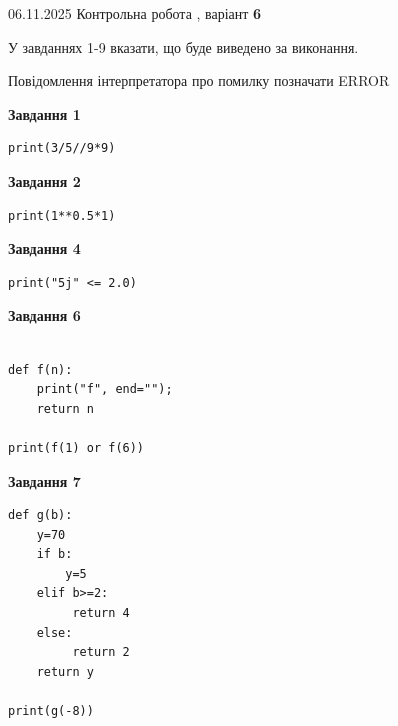 \documentclass[12pt, ukrainian]{article}
\begin{document}
{\Large{06.11.2025 Контрольна робота , варіант  \No \textbf { 6 }\par}}
{
\begin {large}
У завданнях 1-9 вказати, що буде виведено за виконання.

Повідомлення інтерпретатора про помилку позначати ERROR

\begin{minipage}[t]{7.5cm}

\begin{center}
\textbf{Завдання 1}
\end{center}

\begin{verbatim}
print(3/5//9*9)
\end{verbatim}



\begin{center}
\textbf{Завдання 2}
\end{center}

\begin{verbatim}
print(1**0.5*1)
\end{verbatim}



\begin{center}
\textbf{Завдання 4}
\end{center}

\begin{verbatim}
print("5j" <= 2.0)
\end{verbatim}



\begin{center}
\textbf{Завдання 6}
\end{center}

\begin{verbatim}

def f(n):
    print("f", end="");
    return n

print(f(1) or f(6))
\end{verbatim}



\begin{center}
\textbf{Завдання 7}
\end{center}

\begin{verbatim}
def g(b):
    y=70
    if b: 
        y=5
    elif b>=2:
         return 4
    else:
         return 2
    return y

print(g(-8))
\end{verbatim}


\end{minipage}
\end{large}}
\end{document}
